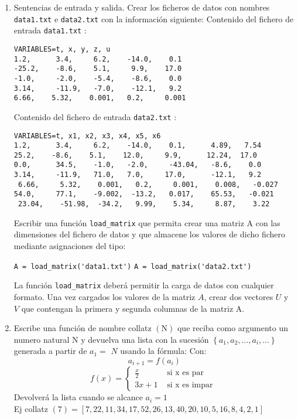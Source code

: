 \documentclass[12pt]{article}
\begin{document}
\begin{enumerate}
\item  Sentencias de entrada y salida.
\vspace{0.5cm}    
Crear los ficheros de datos con nombres  \verb|data1.txt| e 
\verb|data2.txt| con la información siguiente:
\vspace{1cm}
Contenido del fichero de entrada \verb|data1.txt| :
\begin{verbatim}
VARIABLES=t, x, y, z, u
1.2,      3.4,     6.2,    -14.0,    0.1
-25.2,    -8.6,    5.1,     9.9,    17.0
-1.0,     -2.0,    -5.4,    -8.6,    0.0
3.14,     -11.9,   -7.0,    -12.1,   9.2
6.66,    5.32,    0.001,   0.2,     0.001
\end{verbatim}
\vspace{0.1cm}
Contenido del fichero de entrada \verb|data2.txt| :
\begin{verbatim}
VARIABLES=t, x1, x2, x3, x4, x5, x6
1.2,      3.4,     6.2,    -14.0,    0.1,      4.89,   7.54
25.2,    -8.6,    5.1,    12.0,     9.9,      12.24,  17.0
0.0,      34.5,    -1.0,   -2.0,     -43.04,   -8.6,    0.0
3.14,     -11.9,   71.0,   7.0,     17.0,      -12.1,   9.2
 6.66,     5.32,    0.001,   0.2,     0.001,    0.008,   -0.027
54.0,     77.1,    -9.002,  -13.2,   0.017,    65.53,   -0.021
 23.04,    -51.98,  -34.2,   9.99,    5.34,     8.87,    3.22 
\end{verbatim}
\vspace{0.5cm}
Escribir una función \verb|load_matrix| que permita crear una matriz A con las dimensiones 
del fichero de datos y que almacene los valores de dicho fichero mediante 
 asignaciones del tipo: 

 \hspace{1cm} \verb|A = load_matrix('data1.txt')| 
 \hspace{1cm}  \verb|A = load_matrix('data2.txt')|

La función   \verb|load_matrix| deberá permitir la carga de datos con cualquier formato. 
Una vez cargados los valores de la matriz $ A $, crear dos vectores $ U$ y $V$  que contengan la primera y segunda columnas de la matriz A. 
     




	
\item Escribe una función de nombre collatz $(\mathrm{N})$ 
que reciba como argumento un numero natural $\mathrm{N}$ y 
devuelva una lista con la sucesión $\left\{a_{1}, a_{2}, \ldots, a_{i}, \ldots\right\}$ 
generada a partir de $a_{1}=$ $N$ usando la fórmula:
	Con:
	$$
	a_{i+1}=f\left(a_{i}\right)
	$$
	$$
	f(x)=\left\{\begin{array}{cl}
		\frac{x}{2} & \text { si x es par } \\
		3 x+1 & \text { si x es impar }
	\end{array}\right.
	$$
	Devolverá la lista cuando se alcance $a_{i}=1$ \\
	Ej collatz $(7)=[7,22,11,34,17,52,26,13,40,20,10,5,16,8,4,2,1]$
	
\end{enumerate} 
\end{document}
